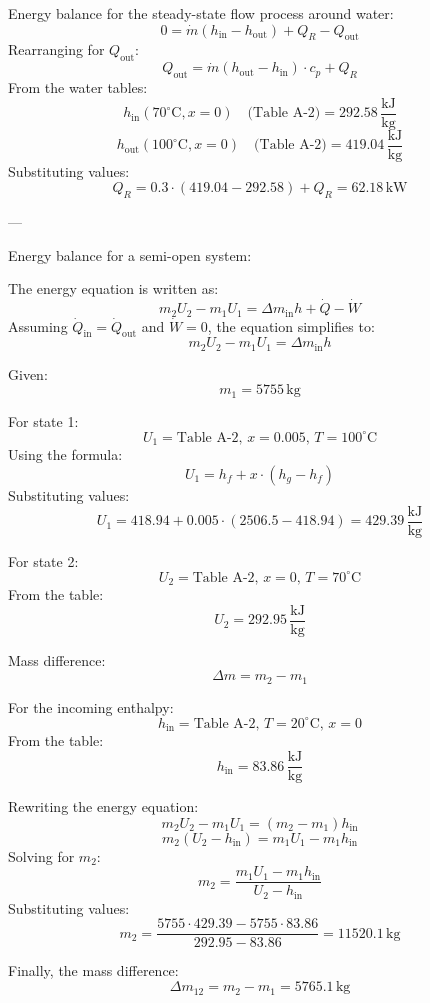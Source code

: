 Energy balance for the steady-state flow process around water:  
\[
0 = \dot{m} (h_{\text{in}} - h_{\text{out}}) + Q_R - Q_{\text{out}}
\]  
Rearranging for \( Q_{\text{out}} \):  
\[
Q_{\text{out}} = \dot{m} (h_{\text{out}} - h_{\text{in}}) \cdot c_p + Q_R
\]  
From the water tables:  
\[
h_{\text{in}}(70^\circ\text{C}, x=0) \quad \text{(Table A-2)} = 292.58 \, \frac{\text{kJ}}{\text{kg}}
\]  
\[
h_{\text{out}}(100^\circ\text{C}, x=0) \quad \text{(Table A-2)} = 419.04 \, \frac{\text{kJ}}{\text{kg}}
\]  
Substituting values:  
\[
Q_R = 0.3 \cdot (419.04 - 292.58) + Q_R = 62.18 \, \text{kW}
\]  

---

Energy balance for a semi-open system:  

The energy equation is written as:  
\[
m_2 U_2 - m_1 U_1 = \Delta m_{\text{in}} h + \dot{Q} - \dot{W}
\]  
Assuming \( \dot{Q}_{\text{in}} = \dot{Q}_{\text{out}} \) and \( \dot{W} = 0 \), the equation simplifies to:  
\[
m_2 U_2 - m_1 U_1 = \Delta m_{\text{in}} h
\]  

Given:  
\[
m_1 = 5755 \, \text{kg}
\]  

For state 1:  
\[
U_1 = \text{Table A-2}, \, x = 0.005, \, T = 100^\circ\text{C}
\]  
Using the formula:  
\[
U_1 = h_f + x \cdot (h_g - h_f)
\]  
Substituting values:  
\[
U_1 = 418.94 + 0.005 \cdot (2506.5 - 418.94) = 429.39 \, \frac{\text{kJ}}{\text{kg}}
\]  

For state 2:  
\[
U_2 = \text{Table A-2}, \, x = 0, \, T = 70^\circ\text{C}
\]  
From the table:  
\[
U_2 = 292.95 \, \frac{\text{kJ}}{\text{kg}}
\]  

Mass difference:  
\[
\Delta m = m_2 - m_1
\]  

For the incoming enthalpy:  
\[
h_{\text{in}} = \text{Table A-2}, \, T = 20^\circ\text{C}, \, x = 0
\]  
From the table:  
\[
h_{\text{in}} = 83.86 \, \frac{\text{kJ}}{\text{kg}}
\]  

Rewriting the energy equation:  
\[
m_2 U_2 - m_1 U_1 = (m_2 - m_1) h_{\text{in}}
\]  
\[
m_2 (U_2 - h_{\text{in}}) = m_1 U_1 - m_1 h_{\text{in}}
\]  
Solving for \( m_2 \):  
\[
m_2 = \frac{m_1 U_1 - m_1 h_{\text{in}}}{U_2 - h_{\text{in}}}
\]  
Substituting values:  
\[
m_2 = \frac{5755 \cdot 429.39 - 5755 \cdot 83.86}{292.95 - 83.86} = 11520.1 \, \text{kg}
\]  

Finally, the mass difference:  
\[
\Delta m_{12} = m_2 - m_1 = 5765.1 \, \text{kg}
\]